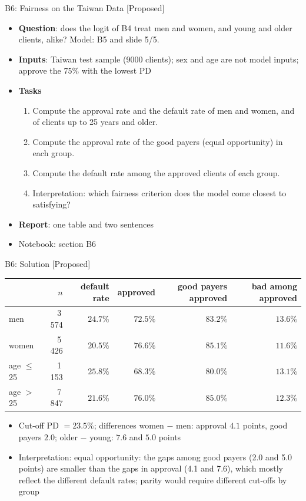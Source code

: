 \begin{frame}{B6: Fairness on the Taiwan Data [Proposed]}
\itemsize{\footnotesize}
\begin{itemize}
\item \textbf{Question}: does the logit of B4 treat men and women, and young and older clients, alike? Model: B5 and slide 5/5.
\item \textbf{Inputs}: Taiwan test sample (9000 clients); sex and age are not model inputs; approve the 75\% with the lowest PD
\item \textbf{Tasks}
\begin{enumerate}
    \item Compute the approval rate and the default rate of men and women, and of clients up to 25 years and older.
    \item Compute the approval rate of the good payers (equal opportunity) in each group.
    \item Compute the default rate among the approved clients of each group.
    \item Interpretation: which fairness criterion does the model come closest to satisfying?
\end{enumerate}
\item \textbf{Report}: one table and two sentences
\item Notebook: section B6
\end{itemize}
\end{frame}

\ifsolutions
\begin{frame}{B6: Solution [Proposed]}
\itemsize{\footnotesize}
\begin{center}
\scriptsize
\begin{tabular}{lrrrrr}
\toprule
& $n$ & default rate & approved & good payers approved & bad among approved \\
\midrule
men & 3\,574 & $24.7\%$ & $72.5\%$ & $83.2\%$ & $13.6\%$ \\
women & 5\,426 & $20.5\%$ & $76.6\%$ & $85.1\%$ & $11.6\%$ \\
age $\le$ 25 & 1\,153 & $25.8\%$ & $68.3\%$ & $80.0\%$ & $13.1\%$ \\
age $>$ 25 & 7\,847 & $21.6\%$ & $76.0\%$ & $85.0\%$ & $12.3\%$ \\
\bottomrule
\end{tabular}
\end{center}
\begin{itemize}
    \item Cut-off PD $= 23.5\%$; differences women $-$ men: approval $4.1$ points, good payers $2.0$; older $-$ young: $7.6$ and $5.0$ points
    \item Interpretation: equal opportunity: the gaps among good payers (2.0 and 5.0 points) are smaller than the gaps in approval (4.1 and 7.6), which mostly reflect the different default rates; parity would require different cut-offs by group
\end{itemize}
\end{frame}
\fi


